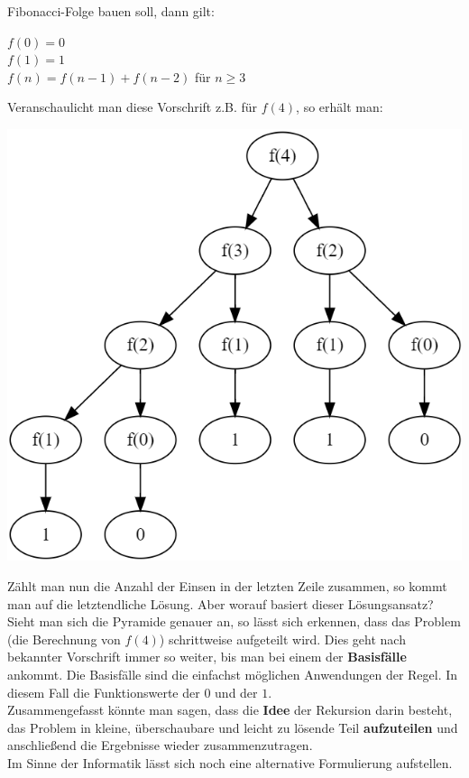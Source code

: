 \documentclass{article}
\begin{document}
Fibonacci-Folge bauen soll, dann gilt: 
\begin{center}
    $f(0) = 0$ \\
    $f(1) = 1$ \\
    $f(n) = f(n-1) + f(n-2)$ für $n\geq 3$
\end{center}
Veranschaulicht man diese Vorschrift z.B. für $f(4)$, so erhält man: 
\begin{center}
    \includegraphics[scale=0.5]{../media/graph_fib.png}
\end{center}
Zählt man nun die Anzahl der Einsen in der letzten Zeile zusammen, so kommt man auf die letztendliche
Lösung. Aber worauf basiert dieser Lösungsansatz? \\
Sieht man sich die Pyramide genauer an, so lässt sich erkennen, dass das Problem (die Berechnung 
von $f(4)$) schrittweise aufgeteilt wird. Dies geht nach bekannter Vorschrift immer so weiter, bis
man bei einem der \textbf{Basisfälle} ankommt. Die Basisfälle sind die einfachst möglichen 
Anwendungen der Regel. In diesem Fall die Funktionswerte der $0$ und der $1$. \\
Zusammengefasst könnte man sagen, dass die \textbf{Idee} der Rekursion darin besteht, das Problem
in kleine, überschaubare und leicht zu lösende Teil \textbf{aufzuteilen} und anschließend die 
Ergebnisse wieder zusammenzutragen.  \\
Im Sinne der Informatik lässt sich noch eine alternative Formulierung aufstellen. 
\end{document}
